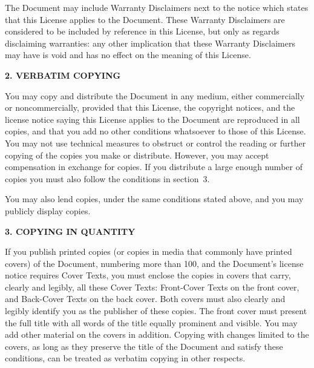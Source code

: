 \begin{scriptsize}
\begin{multicols}{2}
    The Document may include Warranty Disclaimers next to the notice which states that this License applies to the Document.  These Warranty Disclaimers are considered to be included by reference in this License, but only as regards disclaiming warranties: any other implication that these Warranty Disclaimers may have is void and has no effect on the meaning of this License.

    \begin{center}
      {\bf 2. VERBATIM COPYING\par}
    \end{center}

    You may copy and distribute the Document in any medium, either commercially or noncommercially, provided that this License, the copyright notices, and the license notice saying this License applies to the Document are reproduced in all copies, and that you add no other conditions whatsoever to those of this License.  You may not use technical measures to obstruct or control the reading or further copying of the copies you make or distribute.  However, you may accept compensation in exchange for copies.  If you distribute a large enough number of copies you must also follow the conditions in section~3.

    You may also lend copies, under the same conditions stated above, and you may publicly display copies.

    \begin{center}
      {\bf 3. COPYING IN QUANTITY\par}
    \end{center}

    If you publish printed copies (or copies in media that commonly have printed covers) of the Document, numbering more than 100, and the Document's license notice requires Cover Texts, you must enclose the copies in covers that carry, clearly and legibly, all these Cover Texts: Front-Cover Texts on the front cover, and Back-Cover Texts on the back cover.  Both covers must also clearly and legibly identify you as the publisher of these copies. The front cover must present the full title with all words of the title equally prominent and visible. You may add other material on the covers in addition. Copying with changes limited to the covers, as long as they preserve the title of the Document and satisfy these conditions, can be treated as verbatim copying in other respects.


\end{multicols}
\end{scriptsize}
